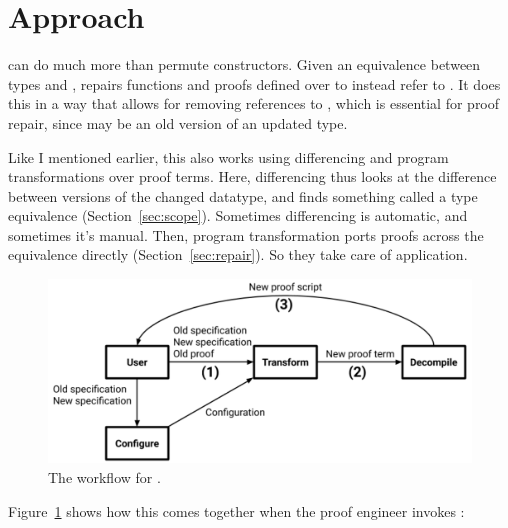 \section{Approach}



\toolnamec can do much more than permute constructors.
Given an equivalence between types \Aa and \B,
\toolnamec repairs functions and proofs defined over \Aa to instead refer to \B.
It does this in a way that allows for removing references to \Aa, which is essential for proof repair,
since \Aa may be an old version of an updated type.

Like I mentioned earlier, this also works using differencing and program transformations over proof terms.
Here, differencing thus looks at the difference between versions of the changed datatype, and finds something called a type equivalence (Section~\ref{sec:scope}). Sometimes differencing is automatic, and sometimes it's manual.
Then, program transformation ports proofs across the equivalence directly (Section~\ref{sec:repair}). So they take care of application.

\begin{figure}
\includegraphics[width=\columnwidth]{often/workflowa.pdf}
\vspace{-0.7cm}
\caption{The workflow for \toolnamec.}
\vspace{-0.1cm}
\label{fig:system}
\end{figure}

Figure~\ref{fig:system} shows how this comes together when the proof engineer invokes \toolnamec:

